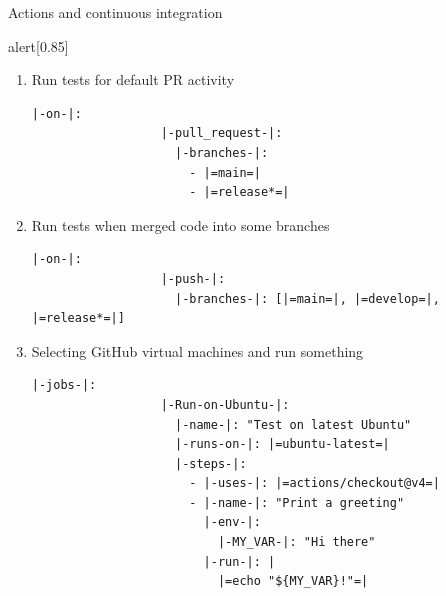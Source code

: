 \begin{frame}[fragile]{Actions and continuous integration}{}
\begin{onlyenv}
\begin{varblock}{alert}[0.85\textwidth]{}
        \end{varblock}
        \begin{enumerate}
            \item<only@3> Run tests for default PR activity\\[-1mm]
            \begin{lstlisting}[style=MyBash, xleftmargin=1mm, xrightmargin=25mm, aboveskip=\medskipamount,
                               moredelim={[is][\color{myCyan}]{|-}{-|}},
                               moredelim={[is][\color{ForestGreen}]{|=}{=|}}]
                |-on-|:
                  |-pull_request-|:
                    |-branches-|:
                      - |=main=|
                      - |=release*=|
            \end{lstlisting}
            \item<only@3> Run tests when merged code into some branches
            \begin{lstlisting}[style=MyBash, xleftmargin=1mm, xrightmargin=25mm,
                               belowskip=-3mm, aboveskip=\medskipamount,
                               moredelim={[is][\color{myCyan}]{|-}{-|}},
                               moredelim={[is][\color{ForestGreen}]{|=}{=|}}]
                |-on-|:
                  |-push-|:
                    |-branches-|: [|=main=|, |=develop=|, |=release*=|]
            \end{lstlisting}
            \item<only@4> Selecting GitHub virtual machines and run something
            \begin{lstlisting}[style=MyBash, xleftmargin=1mm, xrightmargin=25mm,
                               belowskip=-6mm, aboveskip=1.5\medskipamount,
                               moredelim={[is][\color{myCyan}]{|-}{-|}},
                               moredelim={[is][\color{ForestGreen}]{|=}{=|}}]
                |-jobs-|:
                  |-Run-on-Ubuntu-|:
                    |-name-|: "Test on latest Ubuntu"
                    |-runs-on-|: |=ubuntu-latest=|
                    |-steps-|:
                      - |-uses-|: |=actions/checkout@v4=|
                      - |-name-|: "Print a greeting"
                        |-env-|:
                          |-MY_VAR-|: "Hi there"
                        |-run-|: |
                          |=echo "${MY_VAR}!"=|
            \end{lstlisting}

\end{enumerate}
\end{onlyenv}
\end{frame}
